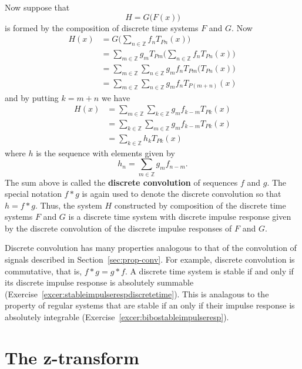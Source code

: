 \documentclass[11pt,a4paper]{book}
\theoremstyle{plain}
\numberwithin{equation}{section}
\newcommand{\ints}{{\mathbb Z}}
\newcommand{\term}{\textbf}
\begin{document}
Now suppose that
\[
H = G\big( F(x) \big) 
\]
is formed by the composition of discrete time systems $F$ and $G$.  Now %
\begin{align*}
H(x) &= G \big( \sum_{n \in \ints} f_n T_{ P n}(x)  \big) \\
&= \sum_{m \in \ints} g_m T_{Pm} \big( \sum_{n \in \ints} f_n T_{ P n}(x)  \big) \\
&= \sum_{m \in \ints} \sum_{n \in \ints} g_m f_n T_{Pm}\big( T_{Pn}(x)  \big) \\
&= \sum_{m \in \ints} \sum_{n \in \ints} g_m f_n T_{P(m+n)}(x) 
\end{align*}
and by putting $k = m+n$ we have
\begin{align*}
H(x) &= \sum_{m \in \ints} \sum_{k \in \ints} g_m f_{k-m} T_{Pk}(x) \\
&=  \sum_{k \in \ints} \sum_{m \in \ints} g_m f_{k-m} T_{Pk}(x) \\
&= \sum_{k \in \ints} h_k T_{Pk}(x)
\end{align*}
where $h$ is the sequence with elements given by
\[
h_n = \sum_{m \in \ints} g_m f_{n-m}.
\]
The sum above is called the \term{discrete convolution} of sequences $f$ and $g$.  The special notation $f * g$ is again used to denote the discrete convolution so that $h = f * g$.  Thus, the system $H$ constructed by composition of the discrete time systems $F$ and $G$ is a discrete time system with discrete impulse response given by the discrete convolution of the discrete impulse responses of $F$ and $G$.

Discrete convolution has many properties analogous to that of the convolution of signals described in Section~\ref{sec:prop-conv}.  For example, discrete convolution is commutative, that is, $f * g = g * f$.  %
A discrete time system is stable if and only if its discrete impulse response is absolutely summable (Exercise~\ref{excer:stableimpulserespdiscretetime}).  This is analagous to the property of regular systems that are stable if an only if their impulse response is absolutely integrable (Exercise~\ref{excer:bibostableimpulseresp}).


\section{The z-transform}


\newcommand{\calZ}{{\mathcal Z}}
\end{document}
